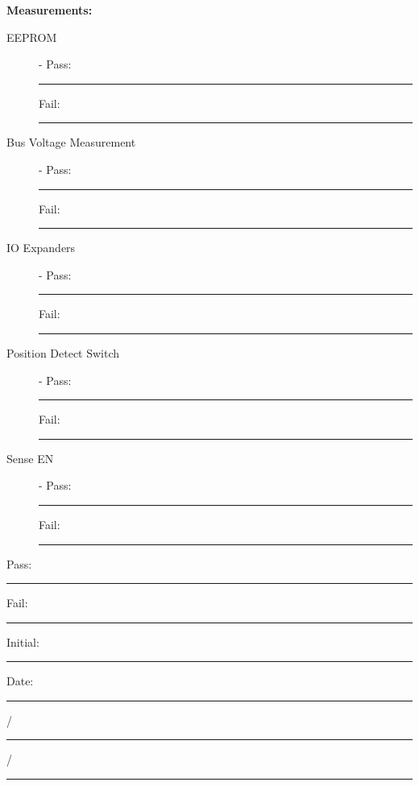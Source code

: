 {\Large \textbf{Measurements:}}\\[5pt]
\begin{description}
\item [EEPROM] -  \hfill Pass: \rule{1cm}{0.15mm} \hspace{0.5cm} Fail: \rule{1cm}{0.15mm}
\item [Bus Voltage Measurement] -  \hfill Pass: \rule{1cm}{0.15mm} \hspace{0.5cm} Fail: \rule{1cm}{0.15mm}
\item [IO Expanders] -  \hfill Pass: \rule{1cm}{0.15mm} \hspace{0.5cm} Fail: \rule{1cm}{0.15mm}
\item [Position Detect Switch] -  \hfill Pass: \rule{1cm}{0.15mm} \hspace{0.5cm} Fail: \rule{1cm}{0.15mm}
\item [Sense EN] -  \hfill Pass: \rule{1cm}{0.15mm} \hspace{0.5cm} Fail: \rule{1cm}{0.15mm}
\end{description}

\vfill

{\large Pass: \rule{1cm}{0.15mm} \hspace{1cm} Fail: \rule{1cm}{0.15mm}} \hfill Initial: \rule{2cm}{0.15mm} \hspace{1cm} Date: \rule{0.5cm}{0.15mm}/\rule{0.5cm}{0.15mm}/\rule{1cm}{0.15mm}\\[5pt]